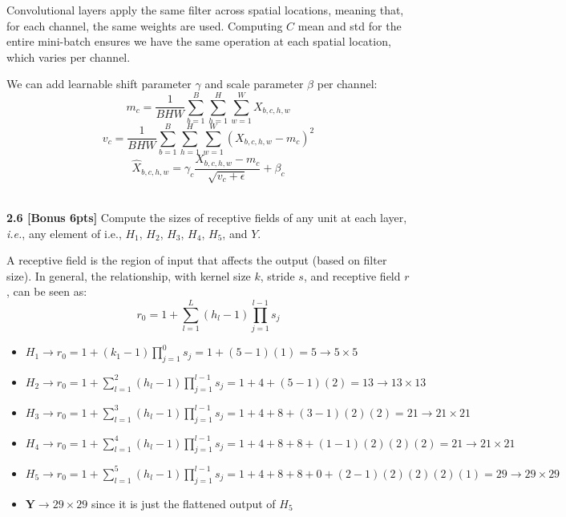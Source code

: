 \documentclass{article}
\begin{document}
{Convolutional layers apply the same filter across spatial locations, meaning that, for each channel, the same weights are used. Computing $C$ mean and std for the entire mini-batch ensures we have the same operation at each spatial location, which varies per channel.

We can add learnable shift parameter $\gamma$ and scale parameter $\beta$ per channel:
\begin{equation}
    m_c = \frac{1}{BHW} \sum_{b=1}^{B} \sum_{h=1}^{H} \sum_{w=1}^{W}X_{b,c,h,w}
\end{equation}
\begin{equation}
    v_c= \frac{1}{BHW} \sum_{b=1}^{B} \sum_{h=1}^{H} \sum_{w=1}^{W}(X_{b,c,h,w}-m_c)^2
\end{equation}
\begin{equation}
    \hat{X}_{b,c,h,w}= \gamma_c \frac{X_{b,c,h,w}-m_c}{\sqrt{v_c+ \epsilon}}+ \beta_c
\end{equation}
}\\

\noindent
\textbf{2.6 [Bonus 6pts]} Compute the sizes of receptive fields of any unit at each layer, \textit{i.e.}, any element
of i.e., $H_1$, $H_2$, $H_3$, $H_4$, $H_5$, and $Y$.\\

{\color{blue}
A receptive field is the region of input that affects the output (based on filter size). In general, the relationship, with kernel size $k$, stride $s$, and receptive field $r$, can be seen as:
\begin{equation}
    r_0= 1+\sum_{l=1}^{L}(h_l-1) \prod_{j=1}^{l-1}s_j
\end{equation}
\begin{itemize}
    \item $H_1 \rightarrow r_0=1+(k_1-1) \prod_{j=1}^{0}s_j=1+(5-1)(1)=5 \rightarrow 5 \times 5$
    \item $H_2 \rightarrow r_0=1+\sum_{l=1}^{2}(h_l-1) \prod_{j=1}^{l-1}s_j=1+4+(5-1)(2)=13 \rightarrow 13 \times 13$
    \item $H_3 \rightarrow r_0=1+\sum_{l=1}^{3}(h_l-1) \prod_{j=1}^{l-1}s_j=1+4+8+(3-1)(2)(2)=21 \rightarrow 21 \times 21$
    \item $H_4 \rightarrow r_0=1+\sum_{l=1}^{4}(h_l-1) \prod_{j=1}^{l-1}s_j=1+4+8+8+(1-1)(2)(2)(2)=21 \rightarrow 21 \times 21$
    \item $H_5 \rightarrow r_0=1+\sum_{l=1}^{5}(h_l-1) \prod_{j=1}^{l-1}s_j=1+4+8+8+0+(2-1)(2)(2)(2)(1)=29\rightarrow 29 \times 29$
    \item $\mathbf{Y} \rightarrow 29 \times 29$ since it is just the flattened output of $H_5$
\end{itemize}
}\\
\end{document}
